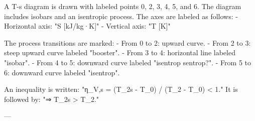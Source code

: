 A T-s diagram is drawn with labeled points 0, 2, 3, 4, 5, and 6. The diagram includes isobars and an isentropic process. The axes are labeled as follows:  
- Horizontal axis: "S [kJ/kg·K]"  
- Vertical axis: "T [K]"  

The process transitions are marked:  
- From 0 to 2: upward curve.  
- From 2 to 3: steep upward curve labeled "booster".  
- From 3 to 4: horizontal line labeled "isobar".  
- From 4 to 5: downward curve labeled "isentrop sentrop?".  
- From 5 to 6: downward curve labeled "isentrop".  

An inequality is written:  
"η_V,s = (T_2s - T_0) / (T_2 - T_0) < 1."  
It is followed by:  
"⇒ T_2s > T_2."  

---